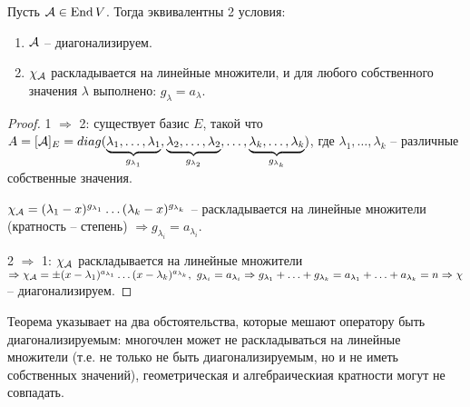 \documentclass[main]{subfiles}
\begin{document}
\begin{theorem}
    Пусть $\mathcal{A} \in \operatorname{End} V$. Тогда эквивалентны 2 условия:
    \begin{enumerate}
        \item $\mathcal{A}$ -- диагонализируем.
        \item $\chi_{\mathcal{A}}$ раскладывается на линейные множители, и для любого собственного значения $\lambda$ выполнено: $g_{\lambda} = a_{\lambda}$.
    \end{enumerate}
\end{theorem}



\begin{proof}
    1 $\Rightarrow$ 2: существует базис $E$, такой что $A = [\mathcal{A}]_E = diag(\underbrace{\lambda_1, \ldots, \lambda_1}_{g_{\lambda_1}},
        \underbrace{\lambda_2, \ldots, \lambda_2}_{g_{\lambda_2}}, \ldots, \underbrace{\lambda_k, \ldots, \lambda_k}_{g_{\lambda_k}})$, где $\lambda_1, \ldots, \lambda_k$ -- различные собственные значения.

    $\chi_{\mathcal{A}} = (\lambda_1 - x)^{g_{\lambda_1}}\ldots (\lambda_k - x)^{g_{\lambda_k}}$ -- раскладывается на линейные множители (кратность -- степень)
    $\Rightarrow g_{\lambda_i} = a_{\lambda_i}$.

    2 $\Rightarrow$ 1: $\chi_{\mathcal{A}}$ раскладывается на линейные множители $\Rightarrow \chi_{\mca} = \pm(x-\lambda_1)^{a_{\lambda_1}}\ldots(x-\lambda_k)^{a_{\lambda_k}},\ g_{\lambda_i} = a_{\lambda_i}
        \Rightarrow g_{\lambda_1}+\ldots+g_{\lambda_k} = a_{\lambda_1}+\ldots+a_{\lambda_k} = n \Rightarrow \chi$ -- диагонализируем.
\end{proof}

Теорема указывает на два обстоятельства, которые мешают оператору быть диагонализируемым: многочлен может не раскладываться на линейные множители (т.е. не только не быть диагонализируемым, но и не иметь собственных значений), геометрическая и алгебраическиая кратности могут не совпадать.
\end{document}
